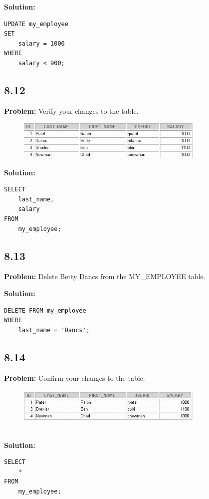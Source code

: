 \documentclass[12pt,a4paper]{article}
\begin{document}
\begin{itemize}
\textbf{Solution:}
\begin{lstlisting}
UPDATE my_employee 
SET
    salary = 1000
WHERE
    salary < 900;
\end{lstlisting}

\subsection*{8.12}
\textbf{Problem:} Verify your changes to the table.
\\
\begin{figure}[htbp]
  \centering
  \includegraphics[width=0.8\textwidth]{Screenshots/812.png}
\end{figure}\newpage
\textbf{Solution:}
\begin{lstlisting}
SELECT 
    last_name,
    salary
FROM
    my_employee;
\end{lstlisting}

\subsection*{8.13}
\textbf{Problem:} Delete Betty Dancs from the MY\_EMPLOYEE table.

\textbf{Solution:}
\begin{lstlisting}
DELETE FROM my_employee 
WHERE
    last_name = 'Dancs';
\end{lstlisting}

\subsection*{8.14}
\textbf{Problem:} Confirm your changes to the table.
\\
\begin{figure}[htbp]
  \centering
  \includegraphics[width=0.8\textwidth]{Screenshots/814.png}
\end{figure}\\
\textbf{Solution:}
\begin{lstlisting}
SELECT 
    *
FROM
    my_employee;
\end{lstlisting}


\end{itemize}
\end{document}
